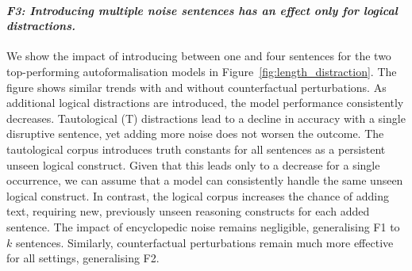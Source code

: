 \noindent \paragraph{\textbf{\emph{F3: Introducing multiple noise sentences has an effect only for logical distractions.}}}
We show the impact of introducing between one and four sentences for the two top-performing autoformalisation models in Figure~\ref{fig:length_distraction}. The figure shows similar trends with and without counterfactual perturbations.
As additional logical distractions are introduced, the model performance consistently decreases. Tautological (T) distractions lead to a decline in accuracy with a single disruptive sentence, yet adding more noise does not worsen the outcome. 
The tautological corpus introduces truth constants for all sentences as a persistent unseen logical construct. Given that this leads only to a decrease for a single occurrence, we can assume that a model can consistently handle the same unseen logical construct. In contrast, the logical corpus increases the chance of adding text, requiring new, previously unseen reasoning constructs for each added sentence. The impact of encyclopedic noise remains negligible, generalising F1 to $k$ sentences. Similarly, counterfactual perturbations remain much more effective for all settings, generalising F2.

